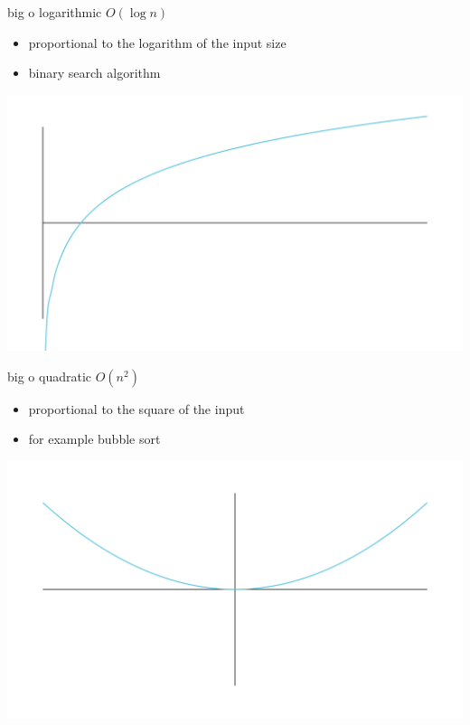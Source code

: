 \documentclass{beamer}
\begin{document}
	\begin{frame}{big o}
		logarithmic $O(\log n)$
		\begin{itemize}
			\item[] proportional to the logarithm of the input size
			\item[] binary search algorithm
		\end{itemize}
		\includegraphics[width=\linewidth,height=0.85\textheight,keepaspectratio]{../assets/log-scale.png}	
	\end{frame}
	
	\begin{frame}{big o}
		quadratic $O(n^2)$
		\begin{itemize}
			\item[] proportional to the square of the input
			\item[] for example bubble sort
		\end{itemize}
		\includegraphics[width=\linewidth,height=0.85\textheight,keepaspectratio]{../assets/quadratic-scale.png}	
	\end{frame}
\end{document}
